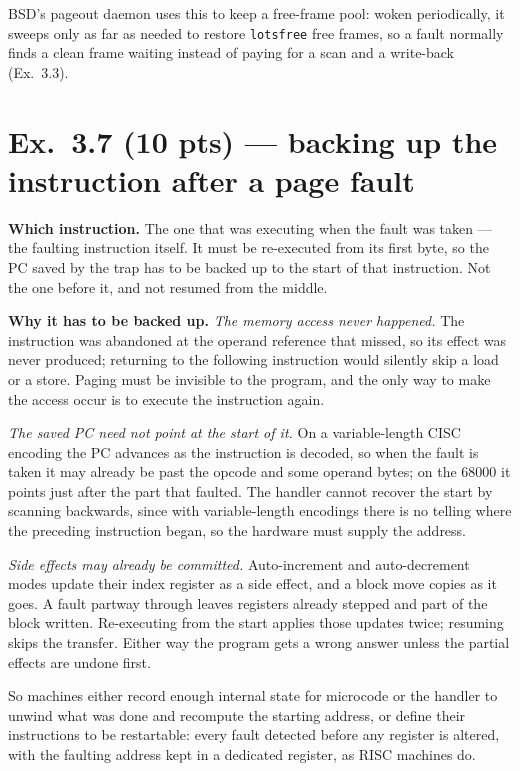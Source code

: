 BSD's pageout daemon uses this to keep a free-frame pool: woken periodically, it sweeps
only as far as needed to restore \texttt{lotsfree} free frames, so a fault normally
finds a clean frame waiting instead of paying for a scan and a write-back (Ex.\ 3.3).

\section*{Ex.\ 3.7 \quad (10 pts) --- backing up the instruction after a page fault}

\textbf{Which instruction.} The one that was executing when the fault was taken ---
the faulting instruction itself. It must be re-executed from its first byte, so the PC
saved by the trap has to be backed up to the start of that instruction. Not the one
before it, and not resumed from the middle.

\textbf{Why it has to be backed up.} \emph{The memory access never happened.} The instruction was abandoned at the operand
reference that missed, so its effect was never produced; returning to the following
instruction would silently skip a load or a store. Paging must be invisible to the
program, and the only way to make the access occur is to execute the instruction again.

\emph{The saved PC need not point at the start of it.} On a variable-length CISC
encoding the PC advances as the instruction is decoded, so when the fault is taken it
may already be past the opcode and some operand bytes; on the 68000 it points just
after the part that faulted. The handler cannot recover the start by scanning
backwards, since with variable-length encodings there is no telling where the preceding
instruction began, so the hardware must supply the address.

\emph{Side effects may already be committed.} Auto-increment and auto-decrement modes
update their index register as a side effect, and a block move copies as it goes. A
fault partway through leaves registers already stepped and part of the block written.
Re-executing from the start applies those updates twice; resuming skips the transfer.
Either way the program gets a wrong answer unless the partial effects are undone first.

So machines either record enough internal state for microcode or the handler to unwind
what was done and recompute the starting address, or define their instructions to be
restartable: every fault detected before any register is altered, with the faulting
address kept in a dedicated register, as RISC machines do.

